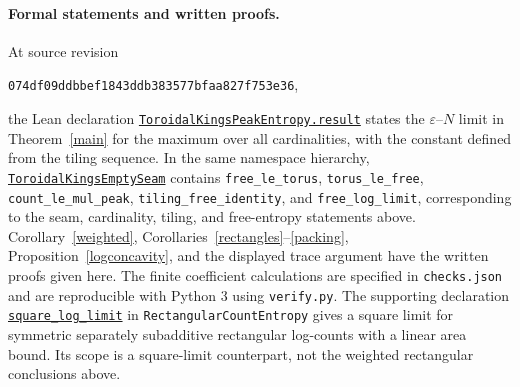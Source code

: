 \documentclass[10pt]{article}
\begin{document}
\paragraph{Formal statements and written proofs.}
At source revision
\begin{center}\small\texttt{074df09ddbbef1843ddb383577bfaa827f753e36},\end{center}
the Lean declaration
\href{https://github.com/the-omega-institute/trureturing/blob/074df09ddbbef1843ddb383577bfaa827f753e36/D5/S3/Combinatorics/Graph/Pressure/ToroidalKingsPeakEntropy.lean}{\texttt{ToroidalKingsPeakEntropy.result}}
states the $\varepsilon$--$N$ limit in Theorem~\ref{main} for the
maximum over all cardinalities, with the constant defined from the
tiling sequence. In the same namespace hierarchy,
\href{https://github.com/the-omega-institute/trureturing/blob/074df09ddbbef1843ddb383577bfaa827f753e36/D5/S3/Combinatorics/Graph/Pressure/ToroidalKingsEmptySeam.lean}{\texttt{ToroidalKingsEmptySeam}}
contains \texttt{free\_le\_torus}, \texttt{torus\_le\_free},
\texttt{count\_le\_mul\_peak}, \texttt{tiling\_free\_identity},
and \texttt{free\_log\_limit}, corresponding to the seam, cardinality,
tiling, and free-entropy statements above. Corollary~\ref{weighted},
Corollaries~\ref{rectangles}--\ref{packing},
Proposition~\ref{logconcavity}, and the displayed trace argument have
the written proofs given here. The finite coefficient calculations
are specified in \texttt{checks.json} and are reproducible with
Python 3 using \texttt{verify.py}.
The supporting declaration
\href{https://github.com/the-omega-institute/trureturing/blob/074df09ddbbef1843ddb383577bfaa827f753e36/D5/S3/Combinatorics/Graph/Pressure/RectangularCountEntropy.lean}{\texttt{square\_log\_limit}}
in \texttt{RectangularCountEntropy}
gives a square limit for symmetric separately subadditive rectangular
log-counts with a linear area bound. Its scope is a square-limit
counterpart, not the weighted rectangular conclusions above.
\end{document}
